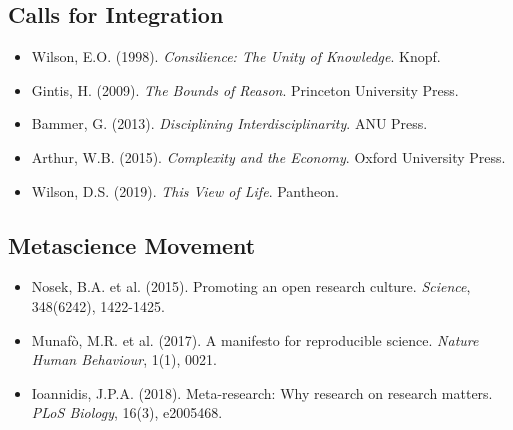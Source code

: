 \subsection{Calls for Integration}
\begin{itemize}[nosep]
\item Wilson, E.O. (1998). \textit{Consilience: The Unity of Knowledge}. Knopf.
\item Gintis, H. (2009). \textit{The Bounds of Reason}. Princeton University Press.
\item Bammer, G. (2013). \textit{Disciplining Interdisciplinarity}. ANU Press.
\item Arthur, W.B. (2015). \textit{Complexity and the Economy}. Oxford University Press.
\item Wilson, D.S. (2019). \textit{This View of Life}. Pantheon.
\end{itemize}

\subsection{Metascience Movement}
\begin{itemize}[nosep]
\item Nosek, B.A. et al. (2015). Promoting an open research culture. \textit{Science}, 348(6242), 1422-1425.
\item Munafò, M.R. et al. (2017). A manifesto for reproducible science. \textit{Nature Human Behaviour}, 1(1), 0021.
\item Ioannidis, J.P.A. (2018). Meta-research: Why research on research matters. \textit{PLoS Biology}, 16(3), e2005468.
\end{itemize}

